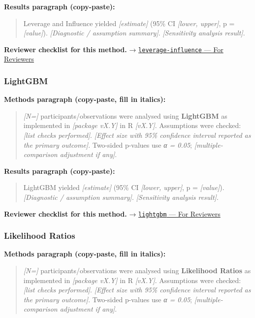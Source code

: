 \documentclass[
]{article}
\begin{document}
\textbf{Results paragraph (copy-paste):}

\begin{quote}
Leverage and Influence yielded \emph{{[}estimate{]}} (95\% CI
\emph{{[}lower, upper{]}}, p = \emph{{[}value{]}}). \emph{{[}Diagnostic
/ assumption summary{]}}. \emph{{[}Sensitivity analysis result{]}}.
\end{quote}

\textbf{Reviewer checklist for this method.} →
\href{../chapters/07-regression/leverage-influence.Rmd\#for-reviewers}{\texttt{leverage-influence}
--- For Reviewers}

\subsubsection{LightGBM}\label{lightgbm}

\textbf{Methods paragraph (copy-paste, fill in italics):}

\begin{quote}
\emph{{[}N={]}} participants/observations were analysed using
\textbf{LightGBM} as implemented in \emph{{[}package vX.Y{]}} in R
\emph{{[}vX.Y{]}}. Assumptions were checked: \emph{{[}list checks
performed{]}}. \emph{{[}Effect size with 95\% confidence interval
reported as the primary outcome{]}}. Two-sided p-values use \emph{α =
0.05}; \emph{{[}multiple-comparison adjustment if any{]}}.
\end{quote}

\textbf{Results paragraph (copy-paste):}

\begin{quote}
LightGBM yielded \emph{{[}estimate{]}} (95\% CI \emph{{[}lower,
upper{]}}, p = \emph{{[}value{]}}). \emph{{[}Diagnostic / assumption
summary{]}}. \emph{{[}Sensitivity analysis result{]}}.
\end{quote}

\textbf{Reviewer checklist for this method.} →
\href{../chapters/13-ml/lightgbm.Rmd\#for-reviewers}{\texttt{lightgbm}
--- For Reviewers}

\subsubsection{Likelihood Ratios}\label{likelihood-ratios}

\textbf{Methods paragraph (copy-paste, fill in italics):}

\begin{quote}
\emph{{[}N={]}} participants/observations were analysed using
\textbf{Likelihood Ratios} as implemented in \emph{{[}package vX.Y{]}}
in R \emph{{[}vX.Y{]}}. Assumptions were checked: \emph{{[}list checks
performed{]}}. \emph{{[}Effect size with 95\% confidence interval
reported as the primary outcome{]}}. Two-sided p-values use \emph{α =
0.05}; \emph{{[}multiple-comparison adjustment if any{]}}.
\end{quote}
\end{document}
